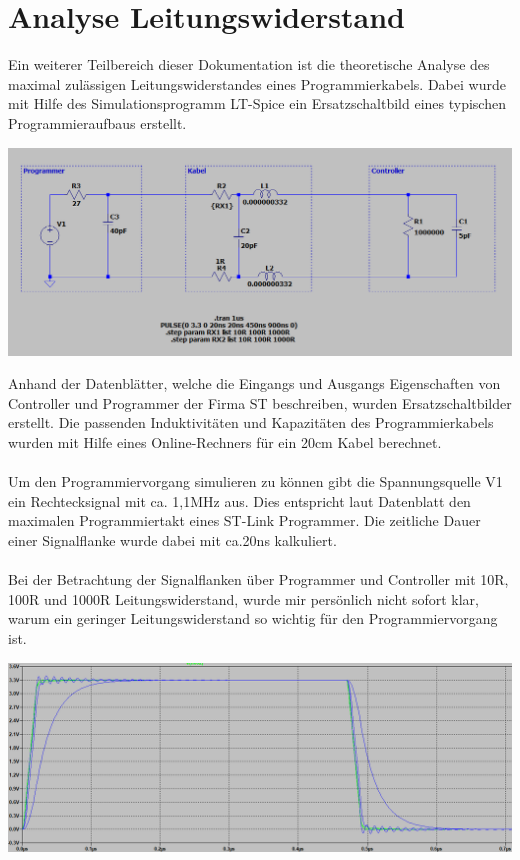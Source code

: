 \section{Analyse Leitungswiderstand}

Ein weiterer Teilbereich dieser Dokumentation ist die theoretische Analyse des maximal zulässigen Leitungswiderstandes eines Programmierkabels. Dabei wurde mit Hilfe des Simulationsprogramm \glqq LT-Spice\grqq{} ein Ersatzschaltbild eines typischen Programmieraufbaus erstellt.\\

\begin{center}
\includegraphics[width=17cm]{Bilder/LTC-SCHALTBILD.png}
\end{center}

Anhand der Datenblätter, welche die Eingangs und Ausgangs Eigenschaften von Controller und Programmer der Firma ST beschreiben, wurden Ersatzschaltbilder erstellt. Die passenden Induktivitäten und Kapazitäten des Programmierkabels wurden mit Hilfe eines Online-Rechners für ein 20cm Kabel berechnet.
\\
\\
Um den Programmiervorgang simulieren zu können gibt die Spannungsquelle V1 ein Rechtecksignal mit ca. 1,1MHz aus. Dies entspricht laut Datenblatt den maximalen Programmiertakt eines ST-Link Programmer. Die zeitliche Dauer einer Signalflanke wurde dabei mit ca.20ns kalkuliert.
\\
\\
Bei der Betrachtung der Signalflanken über Programmer und Controller mit 10R, 100R und 1000R Leitungswiderstand, wurde mir persönlich nicht sofort klar, warum ein geringer Leitungswiderstand so wichtig für den Programmiervorgang ist. 

\begin{center}
\includegraphics[width=17cm]{Bilder/LTC-SIGNALVERLAUF1.png}
\end{center}

